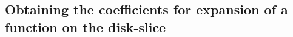 \documentclass[11pt, oneside]{article}   	%
\newcommand{\half}{\frac{1}{2}}
\newcommand{\genjac}{R}
\newcommand{\genjacw}{w_\genjac}
\newcommand{\jacw}{w_P}
\newcommand{\Wabc}{{W^{(a,b,c)}}}
\begin{document}
%
%

\subsection{Obtaining the coefficients for expansion of a function on the disk-slice}
\end{document}
